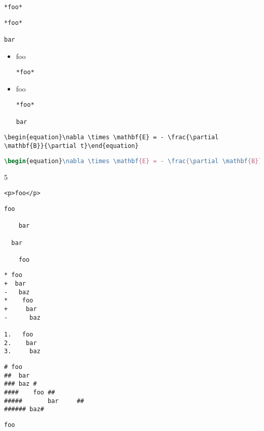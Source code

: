 
\def\mytitle{Fenced Code Blocks}


\begin{verbatim}
*foo*
\end{verbatim}

\begin{verbatim}
*foo*

bar
\end{verbatim}

\begin{itemize}
\item{} foo

\begin{verbatim}
*foo*
\end{verbatim}

\item{} foo

\begin{verbatim}
*foo*

bar
\end{verbatim}

\end{itemize}

\begin{verbatim}
\begin{equation}\nabla \times \mathbf{E} = - \frac{\partial \mathbf{B}}{\partial t}\end{equation}
\end{verbatim}

\begin{lstlisting}[language=tex]
\begin{equation}\nabla \times \mathbf{E} = - \frac{\partial \mathbf{B}}{\partial t}\end{equation}
\end{lstlisting}

5

\begin{verbatim}
<p>foo</p>
\end{verbatim}

\begin{verbatim}
foo

	bar

  bar

    foo
\end{verbatim}

\begin{verbatim}
* foo
+  bar
-   baz
*    foo
+     bar
-      baz

1.   foo
2.    bar
3.     baz
\end{verbatim}

\begin{verbatim}
# foo
##	bar
### baz #
####	foo	##  
#####		bar		##	
###### baz#
\end{verbatim}

\begin{verbatim}
foo
\end{verbatim}



